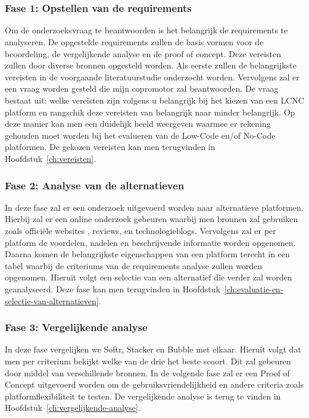 
\chapter{}%
\label{ch:methodologie}

\subsection*{Fase 1: Opstellen van de requirements}%
\label{sec:opstellen-van-de-requirements}
Om de onderzoeksvraag te beantwoorden is het belangrijk 
de requirements te analyseren. De opgestelde requirements zullen de basis vormen voor de beoordeling, de vergelijkende analyse en de proof of concept.
Deze vereisten zullen door diverse bronnen opgesteld worden. Als eerste
zullen de belangrijkste vereisten in de voorgaande literatuurstudie onderzocht worden. Vervolgens zal er een vraag
worden gesteld die mijn copromotor zal beantwoorden. De vraag bestaat uit: welke vereisten zijn volgens u belangrijk bij het kiezen van een 
LCNC platform en rangschik deze vereisten van belangrijk naar minder belangrijk. Op deze manier kan men een duidelijk beeld weergeven waarmee er rekening gehouden moet worden 
bij het evalueren van de Low-Code en/of No-Code platformen. De gekozen vereisten kan men terugvinden in Hoofdstuk~\ref{ch:vereisten}.

\subsection*{Fase 2: Analyse van de alternatieven}%
\label{sec:analyse-van-de-alternatieven}
In deze fase zal er een onderzoek uitgevoerd worden naar alternatieve platformen.
Hierbij zal er een online onderzoek gebeuren waarbij men bronnen zal gebruiken zoals 
officiële websites , reviews, en technologieblogs. Vervolgens zal er per platform de 
voordelen, nadelen en beschrijvende informatie worden opgenomen. Daarna komen 
de belangrijkste eigenschappen van een platform terecht in een tabel waarbij de criteriums
van de requirements analyse zullen worden opgenomen. Hieruit volgt een selectie van een 
alternatief die verder zal worden geanalyseerd. Deze fase kan men terugvinden in Hoofdstuk~\ref{ch:evaluatie-en-selectie-van-alternatieven}.


\subsection*{Fase 3: Vergelijkende analyse}%
\label{sec:vergelijkende-analyse}
In deze fase vergelijken we Softr, Stacker en Bubble met elkaar.
Hieruit volgt dat men per criterium bekijkt welke van de drie het beste scoort. Dit zal gebeuren door middel van verschillende bronnen.
In de volgende fase zal er een Proof of Concept uitgevoerd worden om de gebruiksvriendelijkheid en andere criteria zoals platformflexibiliteit te testen.
De vergelijkende analyse is terug te vinden in Hoofdstuk~\ref{ch:vergelijkende-analyse}.

